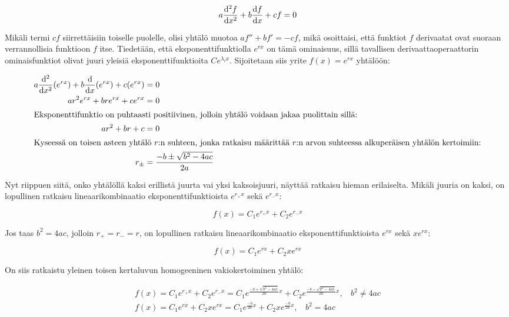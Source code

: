 \documentclass[../johdoksia.tex]{subfiles}
\begin{document}
	\begin{equation}
		a\odv{^2f}{x^2} + b\odv{f}{x} + cf = 0
	\end{equation}

	Mikäli termi $cf$ siirrettäisiin toiselle puolelle, olisi yhtälö muotoa $af'' + bf' = -cf$, mikä osoittaisi, että funktiot $f$ derivaatat ovat suoraan verrannollisia funktioon $f$ itse. Tiedetään, että eksponenttifunktiolla $e^{rx}$ on tämä ominaisuus, sillä tavallisen derivaattaoperaattorin ominaisfunktiot olivat juuri yleisiä eksponenttifunktioita $Ce^{\lambda_i x}$. Sijoitetaan siis yrite $f(x) = e^{rx}$ yhtälöön:
	
	\begin{align*}
		a\odv{^2}{x^2}(e^{rx}) + b\odv{}{x}(e^{rx}) + c(e^{rx}) &= 0 \\
		ar^2e^{rx} + bre^{rx} + ce^{rx} &= 0 \\
		\intertext{Eksponenttifunktio on puhtaasti positiivinen, jolloin yhtälö voidaan jakaa puolittain sillä:}
		ar^2 + br + c &= 0 \\
		\intertext{Kyseessä on toisen asteen yhtälö $r$:n suhteen, jonka ratkaisu määrittää $r$:n arvon suhteessa alkuperäisen yhtälön kertoimiin:}
		r_{\pm} &= \frac{-b\pm\sqrt{b^2 - 4ac}}{2a}
	\end{align*}

	Nyt riippuen siitä, onko yhtälöllä kaksi erillistä juurta vai yksi kaksoisjuuri, näyttää ratkaisu hieman erilaiselta. Mikäli juuria on kaksi, on lopullinen ratkaisu lineaarikombinaatio eksponenttifunktioista $e^{r_+x}$ sekä $e^{r_-x}$:
	
	\begin{equation*}
		f(x) = C_1e^{r_+x} + C_2e^{r_-x}
	\end{equation*}

	Jos taas $b^2 = 4ac$, jolloin $r_+ = r_- = r$, on lopullinen ratkaisu lineaarikombinaatio eksponenttifunktioista $e^{rx}$ sekä $xe^{rx}$:
	
	\begin{equation*}
		f(x) = C_1e^{rx} + C_2xe^{rx}
	\end{equation*}

	On siis ratkaistu yleinen toisen kertaluvun homogeeninen vakiokertoiminen yhtälö:
	
	\begin{equation}
		\boxed{
		\begin{aligned}
			f(x) = C_1e^{r_+x} + C_2e^{r_-x} = C_1e^{\frac{-b+\sqrt{b^2 - 4ac}}{2a}x} + C_2e^{\frac{-b-\sqrt{b^2 - 4ac}}{2a}x}, \ \ \ \ b^2 \neq 4ac \\
			f(x) = C_1e^{rx} + C_2xe^{rx} = C_1e^{\frac{-b}{2a}x} + C_2xe^{\frac{-b}{2a}x}, \ \ \ \ b^2 = 4ac
		\end{aligned}
		}
	\end{equation}
\end{document}
